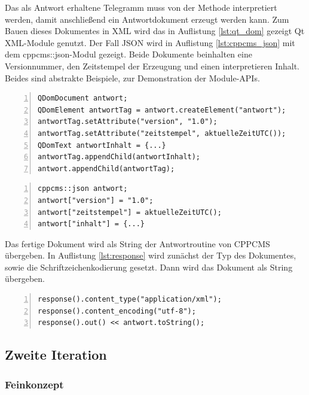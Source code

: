 \documentclass{article}
\begin{document}
Das als Antwort erhaltene Telegramm muss von der Methode interpretiert werden, damit anschließend ein Antwortdokument erzeugt werden kann. Zum Bauen dieses Dokumentes in XML wird das in Auflistung \ref{lst:qt_dom} gezeigt Qt XML-Module genutzt. Der Fall JSON wird in Auflistung \ref{lst:cppcms_json} mit dem cppcms::json-Modul gezeigt. Beide Dokumente beinhalten eine Versionnummer, den Zeitstempel der Erzeugung und einen interpretieren Inhalt. Beides sind abstrakte Beispiele, zur Demonstration der Module-APIs.

\lstset{language=C++}
\begin{lstlisting}[caption=Antwortdokument bauen mit Qt-XML, label=lst:qt_dom, frame=single, numbers=left, tabsize=3, captionpos=b]
QDomDocument antwort;
QDomElement antwortTag = antwort.createElement("antwort");
antwortTag.setAttribute("version", "1.0");
antwortTag.setAttribute("zeitstempel", aktuelleZeitUTC());
QDomText antwortInhalt = {...}
antwortTag.appendChild(antwortInhalt);
antwort.appendChild(antwortTag);
\end{lstlisting}

\lstset{language=C++}
\begin{lstlisting}[caption=Antwortdokument bauen mit CPPCMS-JSON, label=lst:cppcms_json, frame=single, numbers=left, tabsize=3, captionpos=b]
cppcms::json antwort;
antwort["version"] = "1.0";
antwort["zeitstempel"] = aktuelleZeitUTC();
antwort["inhalt"] = {...}
\end{lstlisting}

Das fertige Dokument wird als String der Antwortroutine von CPPCMS übergeben. In Auflistung \ref{lst:response} wird zunächst der Typ des Dokumentes, sowie die Schriftzeichenkodierung gesetzt. Dann wird das Dokument als String übergeben.

\lstset{language=C++}
\begin{lstlisting}[caption=Antwortdokument schreiben, label=lst:response, frame=single, numbers=left, tabsize=3, captionpos=b]
response().content_type("application/xml");
response().content_encoding("utf-8");
response().out() << antwort.toString();
\end{lstlisting}

\subsection{Zweite Iteration}

\subsubsection{Feinkonzept}
\end{document}
